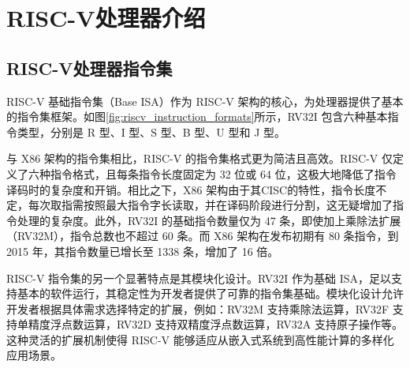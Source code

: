 
\chapter{RISC-V处理器介绍}

\section{RISC-V处理器指令集}

RISC-V 基础指令集（Base ISA）作为 RISC-V 架构的核心，为处理器提供了基本的指令集框架。如图\ref{fig:riscv_instruction_formats}所示，RV32I 包含六种基本指令类型，分别是 R 型、I 型、S 型、B 型、U 型和 J 型。

与 X86 架构的指令集相比，RISC-V 的指令集格式更为简洁且高效。RISC-V 仅定义了六种指令格式，且每条指令长度固定为 32 位或 64 位，这极大地降低了指令译码时的复杂度和开销。相比之下，X86 架构由于其CISC的特性，指令长度不定，每次取指需按照最大指令字长读取，并在译码阶段进行分割，这无疑增加了指令处理的复杂度。此外，RV32I 的基础指令数量仅为 47 条，即使加上乘除法扩展（RV32M），指令总数也不超过 60 条。而 X86 架构在发布初期有 80 条指令，到 2015 年，其指令数量已增长至 1338 条，增加了 16 倍。

RISC-V 指令集的另一个显著特点是其模块化设计。RV32I 作为基础 ISA，足以支持基本的软件运行，其稳定性为开发者提供了可靠的指令集基础。模块化设计允许开发者根据具体需求选择特定的扩展，例如：RV32M 支持乘除法运算，RV32F 支持单精度浮点数运算，RV32D 支持双精度浮点数运算，RV32A 支持原子操作等。这种灵活的扩展机制使得 RISC-V 能够适应从嵌入式系统到高性能计算的多样化应用场景。

